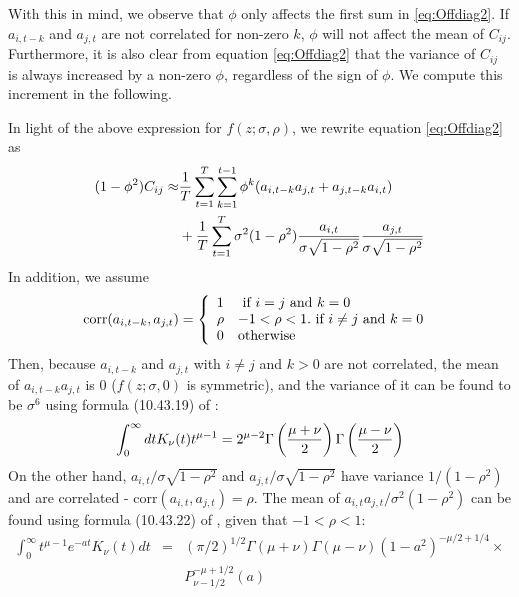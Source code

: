 With this in mind, we observe that $\phi$ only affects the first sum in
\ref{eq:Offdiag2}. If $a_{i,t-k}$ and $a_{j,t}$ are not correlated for
non-zero $k$, $\phi$ will not affect the mean of
$C_{ij}$. Furthermore, it is also clear from equation
\ref{eq:Offdiag2} that the variance of $C_{ij}$ is
always increased by a non-zero $\phi$, regardless of the sign of
$\phi$. We compute this increment in the following.

In light of the above expression for $f(z; \sigma,
\rho)$, we rewrite equation \ref{eq:Offdiag2} as
\begin{equation}\label{eq:Cij_dist}
  \begin{aligned}
    (1 - \phi^2)C_{ij} \approx &
    {1 \over T}
    \sum_{t=1}^{T} \sum_{k=1}^{t-1}\phi^k (a_{i, t-k} a_{j, t} + a_{j,
      t-k} a_{i, t}) \\
    & + {1 \over T} \sum_{t=1}^{T} \sigma^2 (1 - \rho^2) {a_{i,t} \over
      \sigma \sqrt{1 - \rho^2}} {a_{j,t} \over \sigma \sqrt{1 - \rho^2}} \\
  \end{aligned}
\end{equation}
In addition, we assume
\begin{equation*}
  \text{corr}(a_{i, t-k}, a_{j, t}) = \left\{
    \begin{array}{l l}
      1 & \text{ if $i=j$ and $k = 0$ }\\
      \rho & -1 < \rho < 1. \text{ if $i \neq j$ and $k = 0$ }\\
      0 & \text{otherwise}
    \end{array}
  \right.
\end{equation*}
Then, because $a_{i, t-k}$ and $ a_{j, t}$ with $i \neq j$ and $k
> 0$ are not correlated, the mean of $a_{i, t-k} a_{j, t}$ is 0
($f(z; \sigma, 0)$ is symmetric), and the variance of it
can be found to be $\sigma^6$ using formula (10.43.19) of \cite{NIST:DLMF}:
\begin{equation*}
  \int_0^\infty dt K_\nu(t) t^{\mu-1} = 2^{\mu-2}
  \Gamma\left(
    {\mu + \nu \over 2}
  \right) \Gamma\left(
    {\mu - \nu \over 2}
  \right)
\end{equation*}
On the other hand, $a_{i,t}/\sigma \sqrt{1 - \rho^2}$ and
$a_{j,t}/\sigma \sqrt{1 - \rho^2}$ have variance $1/(1 - \rho^2)$
and are correlated - $\text{corr}(a_{i,t}, a_{j,t}) = \rho$. The mean
of $a_{i,t}a_{j,t}/\sigma^2 (1 - \rho^2)$ can be found using formula
(10.43.22) of \cite{NIST:DLMF}, given that $-1 < \rho < 1$:
\begin{eqnarray*}
  \int_0^\infty t^{\mu - 1} e^{-at} K_\nu(t) dt &=& (\pi/2)^{1/2}
  \Gamma(\mu + \nu) \Gamma(\mu - \nu)(1 - a^2)^{-\mu/2 + 1/4} \times\\
  && P^{-\mu+1/2}_{\nu-1/2} (a)
\end{eqnarray*}
